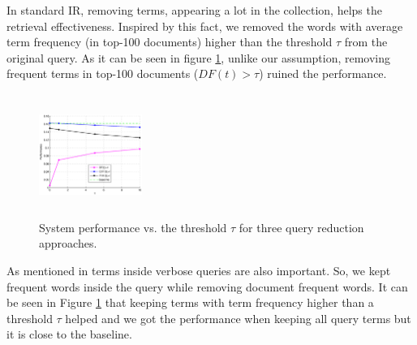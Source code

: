 \documentclass{sig-alternate}
\begin{document}
In standard IR, removing terms, appearing a lot in the collection, helps the retrieval effectiveness. Inspired by this fact, we removed the words with average term frequency (in top-100 documents) higher than the threshold $\tau$ from the original query. As it can be seen in figure \ref{fig:queryreduc}, unlike our assumption, removing frequent terms in top-100 documents ($DF(t)>\tau$) ruined the performance.     
\begin{figure}[htpb]
   \centering
   \includegraphics[width=0.30\textwidth,height=40mm]{figs/threshold.eps}
   \caption{System performance vs. the threshold $\tau$ for three query reduction approaches.}   
   \label{fig:queryreduc} 
\end{figure}

As mentioned in \cite{maxwell2013compact} terms inside verbose queries are also important. So, we kept frequent words inside the query while removing document frequent words. It can be seen in Figure \ref{fig:queryreduc} that keeping terms with term frequency higher than a threshold $\tau$ helped and we got the performance when keeping all query terms but it is close to the baseline. 
\end{document}
